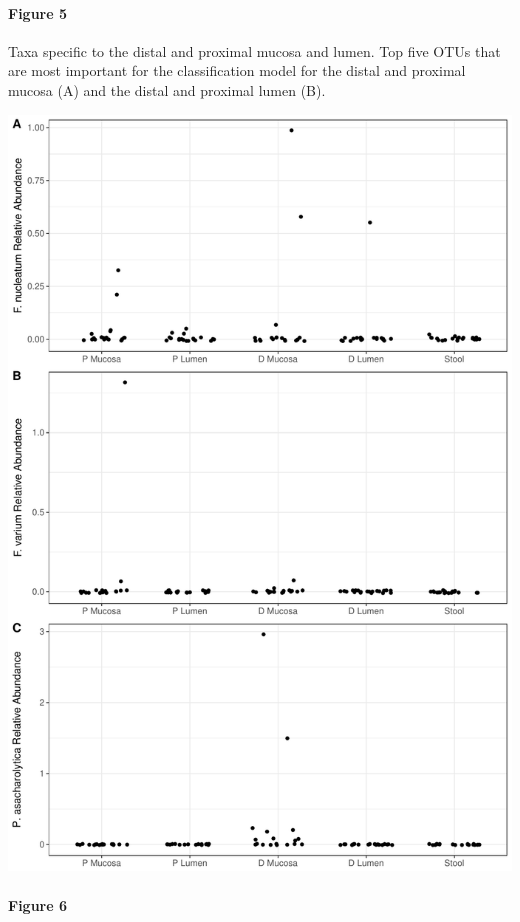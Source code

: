 \documentclass[11pt,]{article}
\let\oldparagraph\paragraph
\renewcommand{\paragraph}[1]{\oldparagraph{#1}\mbox{}}
\begin{document}
\paragraph{Figure 5}\label{figure-5}

Taxa specific to the distal and proximal mucosa and lumen. Top five OTUs
that are most important for the classification model for the distal and
proximal mucosa (A) and the distal and proximal lumen (B).

\newpage

\includegraphics{../submission/figure_6.pdf}

\paragraph{Figure 6}\label{figure-6}
\end{document}
